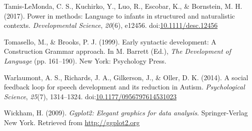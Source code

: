 \documentclass[,man,floatsintext]{apa6}
\begin{document}
\hypertarget{ref-tamislemonda2017power}{}
Tamis-LeMonda, C. S., Kuchirko, Y., Luo, R., Escobar, K., \& Bornstein,
M. H. (2017). Power in methods: Language to infants in structured and
naturalistic contexts. \emph{Developmental Science}, \emph{20}(6),
e12456.
doi:\href{https://doi.org/10.1111/desc.12456}{10.1111/desc.12456}

\hypertarget{ref-tomasello1999early}{}
Tomasello, M., \& Brooks, P. J. (1999). Early syntactic development: A
Construction Grammar approach. In M. Barrett (Ed.), \emph{The
Development of Language} (pp. 161--190). New York: Psychology Press.

\hypertarget{ref-warlaumont2014social}{}
Warlaumont, A. S., Richards, J. A., Gilkerson, J., \& Oller, D. K.
(2014). A social feedback loop for speech development and its reduction
in Autism. \emph{Psychological Science}, \emph{25}(7), 1314--1324.
doi:\href{https://doi.org/10.1177/0956797614531023}{10.1177/0956797614531023}

\hypertarget{ref-R-ggplot2}{}
Wickham, H. (2009). \emph{Ggplot2: Elegant graphics for data analysis}.
Springer-Verlag New York. Retrieved from \url{http://ggplot2.org}

\endgroup
\end{document}
